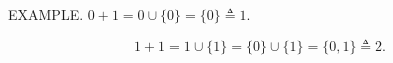 EXAMPLE. $0 + 1 = 0 \cup \{0\} = \{0\} \triangleq 1$.

$$1 + 1 = 1 \cup \{1\} = \{0\} \cup \{1\} = \{0, 1\} \triangleq 2.$$

